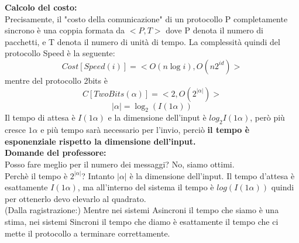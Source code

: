 \textbf{Calcolo del costo:}\\
Precisamente, il "costo della comunicazione" di un protocollo P completamente
sincrono è una coppia formata da $<P,T>$ dove P denota il numero di pacchetti, e
T denota il numero di unità di tempo. La complessità quindi del protocollo Speed
è la seguente:$$Cost[Speed(i)] = <O(n \log i), O(n 2^{id})>$$ mentre del
protocollo 2bits è $$C[TwoBits(\alpha)] = <2, O(2^{|\alpha|})>$$
$$|\alpha|=\log_2(I(1\alpha))$$ Il tempo di attesa è $I(1\alpha)$ e la
dimensione dell'input è $log_2 I(1\alpha)$, però più cresce $1\alpha$ e più
tempo sarà necessario per l'invio, perciò \textbf{il tempo è esponenziale
    rispetto la dimensione dell'input.} \\

\textbf{Domande del professore:}\\
Posso fare meglio per il numero dei messaggi? No, siamo ottimi.\\
Perchè il tempo è $2^{|\alpha|}$? Intanto $|\alpha|$ è la dimensione dell'input.
Il tempo d'attesa è esattamente $I(1\alpha)$, ma all'interno del sistema il
tempo è $log(I(1\alpha))$ quindi per ottenerlo devo elevarlo al quadrato.\\
(Dalla ragistrazione:) Mentre nei sistemi Asincroni il tempo che siamo è una
stima, nei sistemi Sincroni il tempo che diamo è esattamente il tempo che ci
mette il protocollo a terminare correttamente.
